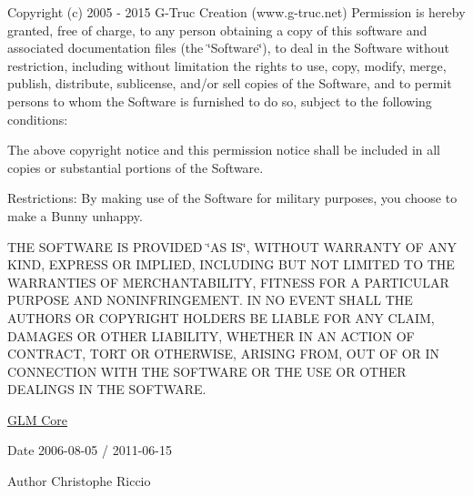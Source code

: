 Copyright (c) 2005 -\/ 2015 G-\/\-Truc Creation (www.\-g-\/truc.\-net) Permission is hereby granted, free of charge, to any person obtaining a copy of this software and associated documentation files (the \char`\"{}\-Software\char`\"{}), to deal in the Software without restriction, including without limitation the rights to use, copy, modify, merge, publish, distribute, sublicense, and/or sell copies of the Software, and to permit persons to whom the Software is furnished to do so, subject to the following conditions\-:

The above copyright notice and this permission notice shall be included in all copies or substantial portions of the Software.

Restrictions\-: By making use of the Software for military purposes, you choose to make a Bunny unhappy.

T\-H\-E S\-O\-F\-T\-W\-A\-R\-E I\-S P\-R\-O\-V\-I\-D\-E\-D \char`\"{}\-A\-S I\-S\char`\"{}, W\-I\-T\-H\-O\-U\-T W\-A\-R\-R\-A\-N\-T\-Y O\-F A\-N\-Y K\-I\-N\-D, E\-X\-P\-R\-E\-S\-S O\-R I\-M\-P\-L\-I\-E\-D, I\-N\-C\-L\-U\-D\-I\-N\-G B\-U\-T N\-O\-T L\-I\-M\-I\-T\-E\-D T\-O T\-H\-E W\-A\-R\-R\-A\-N\-T\-I\-E\-S O\-F M\-E\-R\-C\-H\-A\-N\-T\-A\-B\-I\-L\-I\-T\-Y, F\-I\-T\-N\-E\-S\-S F\-O\-R A P\-A\-R\-T\-I\-C\-U\-L\-A\-R P\-U\-R\-P\-O\-S\-E A\-N\-D N\-O\-N\-I\-N\-F\-R\-I\-N\-G\-E\-M\-E\-N\-T. I\-N N\-O E\-V\-E\-N\-T S\-H\-A\-L\-L T\-H\-E A\-U\-T\-H\-O\-R\-S O\-R C\-O\-P\-Y\-R\-I\-G\-H\-T H\-O\-L\-D\-E\-R\-S B\-E L\-I\-A\-B\-L\-E F\-O\-R A\-N\-Y C\-L\-A\-I\-M, D\-A\-M\-A\-G\-E\-S O\-R O\-T\-H\-E\-R L\-I\-A\-B\-I\-L\-I\-T\-Y, W\-H\-E\-T\-H\-E\-R I\-N A\-N A\-C\-T\-I\-O\-N O\-F C\-O\-N\-T\-R\-A\-C\-T, T\-O\-R\-T O\-R O\-T\-H\-E\-R\-W\-I\-S\-E, A\-R\-I\-S\-I\-N\-G F\-R\-O\-M, O\-U\-T O\-F O\-R I\-N C\-O\-N\-N\-E\-C\-T\-I\-O\-N W\-I\-T\-H T\-H\-E S\-O\-F\-T\-W\-A\-R\-E O\-R T\-H\-E U\-S\-E O\-R O\-T\-H\-E\-R D\-E\-A\-L\-I\-N\-G\-S I\-N T\-H\-E S\-O\-F\-T\-W\-A\-R\-E.

\hyperlink{group__core}{G\-L\-M Core}

\begin{DoxyDate}{Date}
2006-\/08-\/05 / 2011-\/06-\/15 
\end{DoxyDate}
\begin{DoxyAuthor}{Author}
Christophe Riccio 
\end{DoxyAuthor}
